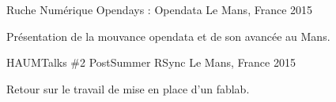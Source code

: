 \begin{cventries}
  \cventry
    {Ruche Numérique} %
    {Opendays : Opendata} %
    {Le Mans, France} %
    {2015} %
    {
      \begin{cvitems} %
			\item {Présentation de la mouvance opendata et de son avancée au Mans.}
      \end{cvitems}
    }

  \cventry
    {HAUMTalks \#2} %
    {PostSummer RSync} %
    {Le Mans, France} %
    {2015} %
    {
      \begin{cvitems} %
			\item {Retour sur le travail de mise en place d'un fablab.}
      \end{cvitems}
    }

\end{cventries}
